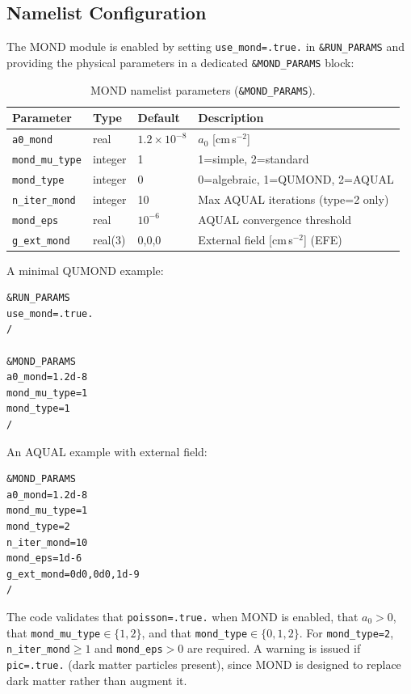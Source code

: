 \documentclass[fleqn,usenatbib]{mnras}
\newcommand{\code}[1]{\texttt{#1}}
\newcommand{\azero}{a_0}
\begin{document}
\subsection{Namelist Configuration}
\label{sec:mond_namelist}

The MOND module is enabled by setting \code{use\_mond=.true.} in
\code{\&RUN\_PARAMS} and providing the physical parameters in a
dedicated \code{\&MOND\_PARAMS} block:

\begin{table}
\centering
\caption{MOND namelist parameters (\code{\&MOND\_PARAMS}).}
\label{tab:mond_params}
\small
\begin{tabular}{llll}
\toprule
Parameter & Type & Default & Description \\
\midrule
\code{a0\_mond}      & real    & $1.2\times10^{-8}$ & $\azero$ [cm\,s$^{-2}$] \\
\code{mond\_mu\_type} & integer & 1 & 1=simple, 2=standard \\
\code{mond\_type}     & integer & 0 & 0=algebraic, 1=QUMOND, 2=AQUAL \\
\code{n\_iter\_mond}  & integer & 10 & Max AQUAL iterations (type=2 only) \\
\code{mond\_eps}      & real    & $10^{-6}$ & AQUAL convergence threshold \\
\code{g\_ext\_mond}   & real(3) & 0,0,0 & External field [cm\,s$^{-2}$] (EFE) \\
\bottomrule
\end{tabular}
\end{table}

A minimal QUMOND example:
\begin{verbatim}
&RUN_PARAMS
use_mond=.true.
/

&MOND_PARAMS
a0_mond=1.2d-8
mond_mu_type=1
mond_type=1
/
\end{verbatim}

An AQUAL example with external field:
\begin{verbatim}
&MOND_PARAMS
a0_mond=1.2d-8
mond_mu_type=1
mond_type=2
n_iter_mond=10
mond_eps=1d-6
g_ext_mond=0d0,0d0,1d-9
/
\end{verbatim}

The code validates that \code{poisson=.true.} when MOND is enabled,
that $\azero > 0$, that \code{mond\_mu\_type}$\in\{1,2\}$, and that
\code{mond\_type}$\in\{0,1,2\}$.  For \code{mond\_type=2},
\code{n\_iter\_mond}$\geq 1$ and \code{mond\_eps}${}>0$ are required.
A warning is issued if \code{pic=.true.}
(dark matter particles present), since MOND is designed to replace
dark matter rather than augment it.
\end{document}
